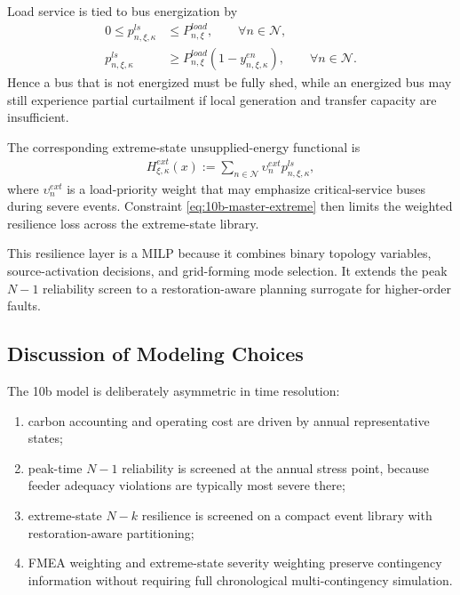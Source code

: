 Load service is tied to bus energization by
\begin{align}
0 \le p_{n,\xi,\kappa}^{ls} &\le P_{n,\xi}^{load},
\qquad \forall n\in\mathcal{N},
\label{eq:10b-ext-shed-bound}\\
p_{n,\xi,\kappa}^{ls} &\ge P_{n,\xi}^{load}(1-y_{n,\xi,\kappa}^{en}),
\qquad \forall n\in\mathcal{N}.
\label{eq:10b-ext-deenergized-shed}
\end{align}
Hence a bus that is not energized must be fully shed, while an energized bus may still experience partial curtailment if local generation and transfer capacity are insufficient.

The corresponding extreme-state unsupplied-energy functional is
\begin{align}
H^{ext}_{\xi,\kappa}(x) := \sum_{n\in\mathcal{N}} \upsilon_n^{ext} p_{n,\xi,\kappa}^{ls},
\label{eq:10b-ext-shed-functional}
\end{align}
where \(\upsilon_n^{ext}\) is a load-priority weight that may emphasize critical-service buses during severe events. Constraint \eqref{eq:10b-master-extreme} then limits the weighted resilience loss across the extreme-state library.

This resilience layer is a MILP because it combines binary topology variables, source-activation decisions, and grid-forming mode selection. It extends the peak \(N{-}1\) reliability screen to a restoration-aware planning surrogate for higher-order faults.

\subsection{Discussion of Modeling Choices}

The 10b model is deliberately asymmetric in time resolution:
\begin{enumerate}
  \item carbon accounting and operating cost are driven by annual representative states;
  \item peak-time \(N{-}1\) reliability is screened at the annual stress point, because feeder adequacy violations are typically most severe there;
  \item extreme-state \(N{-}k\) resilience is screened on a compact event library with restoration-aware partitioning;
  \item FMEA weighting and extreme-state severity weighting preserve contingency information without requiring full chronological multi-contingency simulation.
\end{enumerate}

